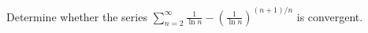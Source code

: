 Determine whether the series $\displaystyle \sum_{n=2}^\infty \frac{1}{\ln n} -
\left(\frac{1}{\ln n}\right)^{(n+1)/n}$ is convergent.
